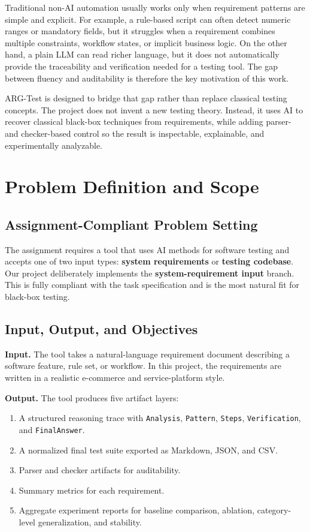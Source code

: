 \documentclass{article}
\begin{document}
Traditional non-AI automation usually works only when requirement patterns are simple and explicit. For example, a rule-based script can often detect numeric ranges or mandatory fields, but it struggles when a requirement combines multiple constraints, workflow states, or implicit business logic. On the other hand, a plain LLM can read richer language, but it does not automatically provide the traceability and verification needed for a testing tool. The gap between fluency and auditability is therefore the key motivation of this work.

ARG-Test is designed to bridge that gap rather than replace classical testing concepts. The project does not invent a new testing theory. Instead, it uses AI to recover classical black-box techniques from requirements, while adding parser- and checker-based control so the result is inspectable, explainable, and experimentally analyzable.

\section{Problem Definition and Scope}
\subsection{Assignment-Compliant Problem Setting}
The assignment requires a tool that uses AI methods for software testing and accepts one of two input types: \textbf{system requirements} or \textbf{testing codebase}. Our project deliberately implements the \textbf{system-requirement input} branch. This is fully compliant with the task specification and is the most natural fit for black-box testing.

\subsection{Input, Output, and Objectives}
\textbf{Input.} The tool takes a natural-language requirement document describing a software feature, rule set, or workflow. In this project, the requirements are written in a realistic e-commerce and service-platform style.

\textbf{Output.} The tool produces five artifact layers:
\begin{enumerate}[leftmargin=1.5em]
\item A structured reasoning trace with \texttt{Analysis}, \texttt{Pattern}, \texttt{Steps}, \texttt{Verification}, and \texttt{FinalAnswer}.
\item A normalized final test suite exported as Markdown, JSON, and CSV.
\item Parser and checker artifacts for auditability.
\item Summary metrics for each requirement.
\item Aggregate experiment reports for baseline comparison, ablation, category-level generalization, and stability.
\end{enumerate}
\end{document}
